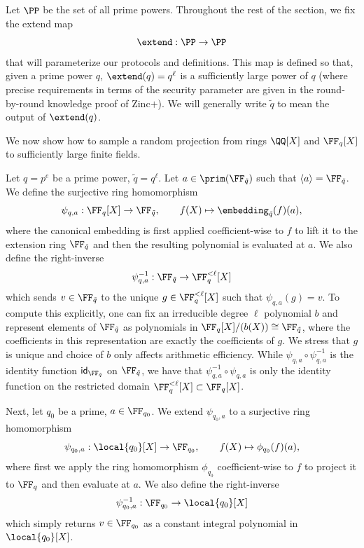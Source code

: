 Let $\PP$ be the set of all prime powers. Throughout the rest of the section, we fix the extend map
\[
\extend: \PP \to  \PP
\]
that will parameterize our protocols and definitions. This map is defined so that, given a prime power $q$, $\extend(q) = q^\ell$ is a sufficiently large power of $q$ (where precise requirements in terms of the security parameter are given in the round-by-round knowledge proof of Zinc$+$). We will generally write $\tilde{q}$ to mean the output of $\extend(q)$.

We now show how to sample a random projection from rings $\QQ[X]$ and $\FF_{q}[X]$ to sufficiently large finite fields.

\begin{definition}
\label{def:psi_i_alpha}
Let $q = p^e$ be a prime power, $\tilde{q} = q^\ell$. Let $a \in \prim(\FF_{\tilde q})$ such that $\langle a \rangle = \FF_{\tilde q}$. We define the surjective ring homomorphism 
\[
\psi_{q,a}: \FF_q[X]\to\FF_{\tilde q},\qquad f(X) \mapsto \embedding_{\tilde{q}}(f)(a),
\]
where the canonical embedding is first applied coefficient-wise to $f$ to lift it to the extension ring $\FF_{\tilde q}$ and then the resulting polynomial is evaluated at $a$. We also define the right-inverse
\[
\psi_{q,a}^{-1}: \FF_{\tilde q} \to \FF_{q}^{<\ell}[X]
\]
which sends $v \in \FF_{\tilde{q}}$ to the unique $g \in \FF_{q}^{<\ell}[X]$ such that $\psi_{q,a}(g) = v$. To compute this explicitly, one can fix an irreducible degree $\ell$ polynomial $b$ and represent elements of $\FF_{\tilde q}$ as polynomials in $\FF_{q}[X]/(b(X)) \cong \FF_{\tilde q}$, where the coefficients in this representation are exactly the coefficients of $g$. We stress that $g$ is unique and choice of $b$ only affects arithmetic efficiency. While $\psi_{q,a} \circ \psi_{q,a}^{-1}$ is the identity function $\mathsf{id}_{\FF_{\tilde q}}$ on $\FF_{\tilde q}$, we have that $\psi_{q,a}^{-1} \circ \psi_{q,a}$ is only the identity function on the restricted domain $\FF^{<\ell}_{q}[X] \subset \FF_{q}[X]$.
 
Next, let $q_0$ be a prime, $a \in \FF_{q_0}$. We extend $\psi_{q_0,a}$ to a surjective ring homomorphism
\[
\psi_{q_0,a}: \local{q_0}[X]\to\FF_{q_0}, \qquad f(X) \mapsto \phi_{q_0}(f)(a),
\]
where first we apply the ring homomorphism $\phi_{q_0}$ coefficient-wise to $f$ to project it to $\FF_q$ and then evaluate at $a$. We also define the right-inverse
\[
\psi_{q_0,a}^{-1}: \FF_{q_0} \to \local{q_0}[X]
\]
which simply returns $v \in \FF_{q_0}$ as a constant integral polynomial in $\local{q_0}[X]$.
\end{definition}

